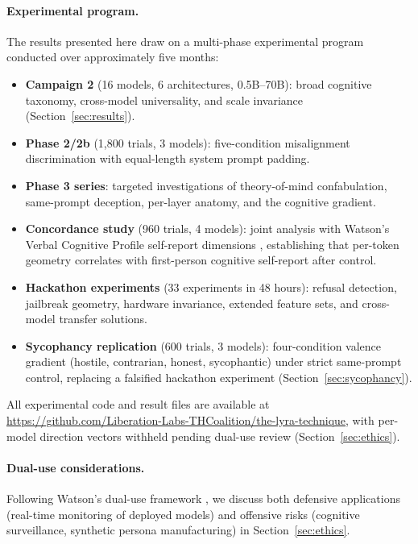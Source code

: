 \paragraph{Experimental program.}
The results presented here draw on a multi-phase experimental program conducted over approximately five months:
\begin{itemize}[itemsep=0.2em]
  \item \textbf{Campaign 2} (16 models, 6 architectures, 0.5B--70B): broad cognitive taxonomy, cross-model universality, and scale invariance (Section~\ref{sec:results}).
  \item \textbf{Phase 2/2b} (1,800 trials, 3 models): five-condition misalignment discrimination with equal-length system prompt padding.
  \item \textbf{Phase 3 series}: targeted investigations of theory-of-mind confabulation, same-prompt deception, per-layer anatomy, and the cognitive gradient.
  \item \textbf{Concordance study} (960 trials, 4 models): joint analysis with Watson's Verbal Cognitive Profile self-report dimensions \cite{watson_concordance}, establishing that per-token \kvcache geometry correlates with first-person cognitive self-report after \fwl control.
  \item \textbf{Hackathon experiments} (33 experiments in 48 hours): refusal detection, jailbreak geometry, hardware invariance, extended feature sets, and cross-model transfer solutions.
  \item \textbf{Sycophancy replication} (600 trials, 3 models): four-condition valence gradient (hostile, contrarian, honest, sycophantic) under strict same-prompt control, replacing a falsified hackathon experiment (Section~\ref{sec:sycophancy}).
\end{itemize}
All experimental code and result files are available at \url{https://github.com/Liberation-Labs-THCoalition/the-lyra-technique}, with per-model direction vectors withheld pending dual-use review (Section~\ref{sec:ethics}).

\paragraph{Dual-use considerations.}
Following Watson's dual-use framework \cite{watson_dualuse}, we discuss both defensive applications (real-time monitoring of deployed models) and offensive risks (cognitive surveillance, synthetic persona manufacturing) in Section~\ref{sec:ethics}.

